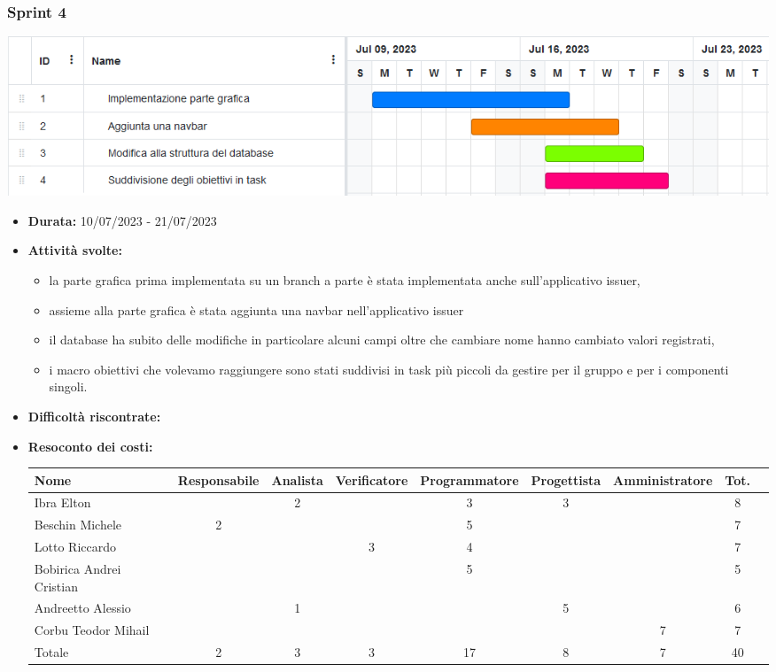 \subsubsection{Sprint 4}
\begin{center}
    \includegraphics[scale = 0.5]{./res/img/Sprint_4.png}
  \end{center}
\begin{itemize}
    \item \textbf{Durata:} 10/07/2023 - 21/07/2023 
    \item \textbf{Attività svolte:}
    \begin{itemize}
        \item la parte grafica prima implementata su un branch a parte è stata implementata anche sull'applicativo issuer,
        \item assieme alla parte grafica è stata aggiunta una navbar nell'applicativo issuer 
        \item il database ha subito delle modifiche in particolare alcuni campi oltre che cambiare nome hanno cambiato valori registrati,
        \item i macro obiettivi che volevamo raggiungere sono stati suddivisi in task più piccoli da gestire per il gruppo e per i componenti singoli.
    \end{itemize}
    \item \textbf{Difficoltà riscontrate:}
    \item \textbf{Resoconto dei costi:}
    \begin{longtable}{|p{}|c|c|c|c|c|c|c|c|}
        \hline
        Nome & Responsabile & Analista & Verificatore & Programmatore & Progettista & Amministratore & Tot.\\
        \hline
        Ibra Elton & &2 & &3 &3 & &8\\
        \hline
        Beschin Michele &2 & & &5 & & &7 \\
        \hline
        Lotto Riccardo & & &3 &4 & & &7 \\
        \hline
        Bobirica Andrei Cristian & & & &5 & & &5 \\
        \hline
        Andreetto Alessio & &1 & & &5 & &6 \\
        \hline
        Corbu Teodor Mihail & & & & & &7 &7 \\
        \hline
        Totale &2 &3 &3 &17 &8 &7 &40 \\
        \hline
    \end{longtable}
    \end{itemize}
